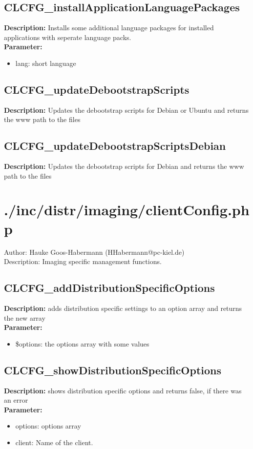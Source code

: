 \subsection{CLCFG\_installApplicationLanguagePackages}
\textbf{Description:} Installs some additional language packages for installed applications with seperate language packs.\\
\textbf{Parameter:}
\begin{itemize}
\item lang: short language
\end{itemize}

\subsection{CLCFG\_updateDebootstrapScripts}
\textbf{Description:} Updates the debootstrap scripts for Debian or Ubuntu and returns the www path to the files\\

\subsection{CLCFG\_updateDebootstrapScriptsDebian}
\textbf{Description:} Updates the debootstrap scripts for Debian and returns the www path to the files\\

\newpage\section{./inc/distr/imaging/clientConfig.php}
 Author: Hauke Goos-Habermann (HHabermann@pc-kiel.de)\\
 Description: Imaging specific management functions.\\

\subsection{CLCFG\_addDistributionSpecificOptions}
\textbf{Description:} adds distribution specific settings to an option array and returns the new array\\
\textbf{Parameter:}
\begin{itemize}
\item \$options: the options array with some values
\end{itemize}

\subsection{CLCFG\_showDistributionSpecificOptions}
\textbf{Description:} shows distribution specific options and returns false, if there was an error\\
\textbf{Parameter:}
\begin{itemize}
\item options: options array
\item client: Name of the client.
\end{itemize}

